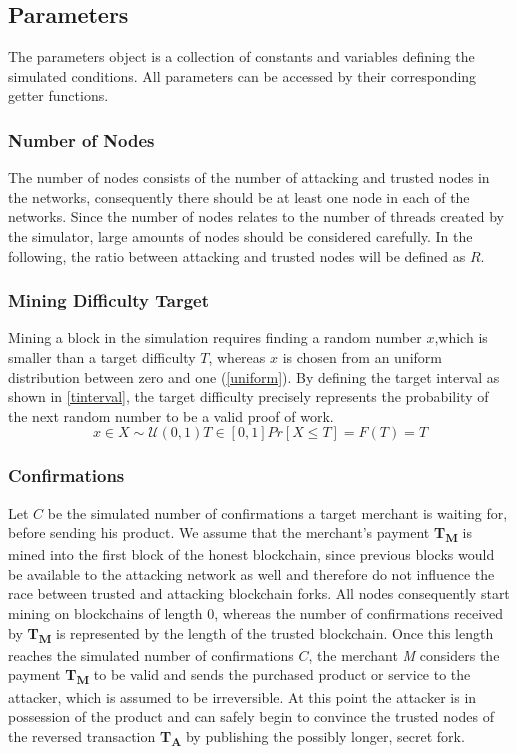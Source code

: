 \documentclass[a4paper,12pt,twoside]{report}
\begin{document}
\subsection{Parameters} \label{params}
The parameters object is a collection of constants and variables defining the simulated conditions. All parameters can be accessed by their corresponding getter functions.
\subsubsection{Number of Nodes}
The number of nodes consists of the number of attacking and trusted nodes in the networks, consequently there should be at least one node in each of the networks. Since the number of nodes relates to the number of threads created by the simulator, large amounts of nodes should be considered carefully. In the following, the ratio between attacking and trusted nodes will be defined as $R$.
\subsubsection{Mining Difficulty Target}
Mining a block in the simulation requires finding a random number $x$,which is smaller than a target difficulty $T$, whereas $x$ is chosen from an uniform distribution between zero and one (\autoref{uniform}). By defining the target interval as shown in \autoref{tinterval}, the target difficulty precisely represents the probability of the next random number to be a valid proof of work.
\begin{subequations}
\begin{equation}\label{uniform}
x \in X\sim \mathcal{U}(0,1)
\end{equation}
\begin{equation}\label{tinterval}
T \in [0,1]
\end{equation}
\begin{equation}\label{probability}
Pr[X \leq T] = F(T) = T
\end{equation}
\end{subequations}
\subsubsection{Confirmations}
Let $C$ be the simulated number of confirmations a target merchant is waiting for, before sending his product. We assume that the merchant's payment \textbf{T\textsubscript{M}} is mined into the first block of the honest blockchain, since previous blocks would be available to the attacking network as well and therefore do not influence the race between trusted and attacking blockchain forks. All nodes consequently start mining on blockchains of length 0, whereas the number of confirmations received by \textbf{T\textsubscript{M}} is represented by the length of the trusted blockchain. Once this length reaches the simulated number of confirmations $C$, the merchant \textit{M} considers the payment \textbf{T\textsubscript{M}} to be valid and sends the purchased product or service to the attacker, which is assumed to be irreversible. At this point the attacker is in possession of the product and can safely begin to convince the trusted nodes of the reversed transaction \textbf{T\textsubscript{A}} by publishing the possibly longer, secret fork.
\end{document}
